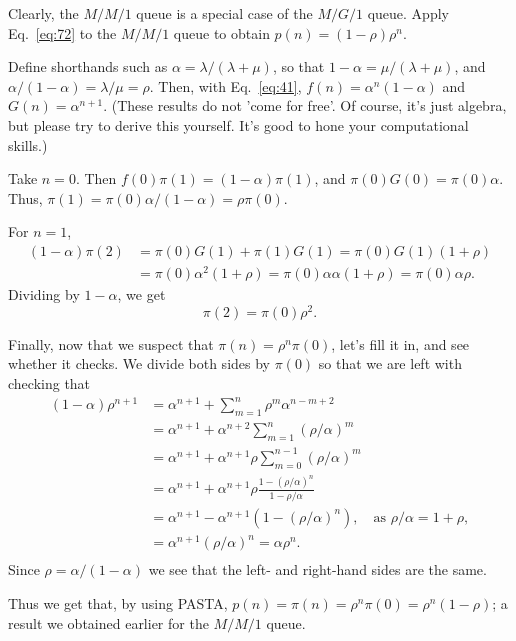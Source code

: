 \begin{exercise}
  Clearly, the $M/M/1$ queue is a special case of the $M/G/1$
  queue. Apply Eq.~\eqref{eq:72} to the $M/M/1$ queue to obtain $p(n)=(1-\rho)\rho^n$. 
  \begin{hint}
 Define shorthands
    such as $\alpha=\lambda/(\lambda+\mu)$, so that
    $1-\alpha = \mu/(\lambda+\mu)$, and
    $\alpha/(1-\alpha) = \lambda /\mu = \rho$.  Then, with Eq.~\eqref{eq:41}, $f(n) = \alpha^n(1-\alpha)$ and $G(n) = \alpha^{n+1}$.  (These results do not 'come for
    free'. Of course, it's just algebra, but please try to derive this
    yourself. It's good to hone your computational skills.)
  \end{hint}
    \begin{solution}
      Take $n=0$. Then $f(0) \pi(1) = (1-\alpha)\pi(1)$, and
      $\pi(0)G(0) = \pi(0)\alpha$. Thus,
      $\pi(1) = \pi(0)\alpha/(1-\alpha) = \rho \pi(0)$. 

For $n=1$,
\begin{equation*}
  \begin{split}
  (1-\alpha)  \pi(2) 
&= \pi(0)G(1) + \pi(1)G(1) = \pi(0)G(1)(1+\rho) \\
&= \pi(0)\alpha^2(1+\rho) = \pi(0)\alpha \alpha (1+\rho) = \pi(0)\alpha \rho.
  \end{split}
\end{equation*}
Dividing by $1-\alpha$, we get
\begin{equation*}
  \pi(2) = \pi(0)\rho^2.
\end{equation*}

Finally, now that we suspect that $\pi(n) = \rho^n \pi(0)$, let's fill
it in, and see whether it checks. We divide both sides by $\pi(0)$ so
that we are left with checking that
\begin{align*}
    (1-\alpha)\rho^{n+1} 
&= \alpha^{n+1} + \sum_{m=1}^n \rho^m \alpha^{n-m+2}  \\
&= \alpha^{n+1} + \alpha^{n+2}\sum_{m=1}^n (\rho/\alpha)^m  \\
&= \alpha^{n+1} + \alpha^{n+1}\rho \sum_{m=0}^{n-1} (\rho/\alpha)^m \\
&= \alpha^{n+1} + \alpha^{n+1}\rho \frac{1-(\rho/\alpha)^n}{1-\rho/\alpha}\\
&= \alpha^{n+1} - \alpha^{n+1}(1-(\rho/\alpha)^n), \quad\text{as } \rho/\alpha = 1+\rho,\\
&= \alpha^{n+1}(\rho/\alpha)^n = \alpha \rho^n.\\
\end{align*}
Since $\rho=\alpha/(1-\alpha)$ we see that the left- and right-hand sides are the same. 

Thus we get that, by using PASTA, $p(n) = \pi(n) = \rho^n \pi(0) = \rho^n (1-\rho)$; a result we
obtained earlier for the $M/M/1$ queue.
\end{solution}
\end{exercise}




